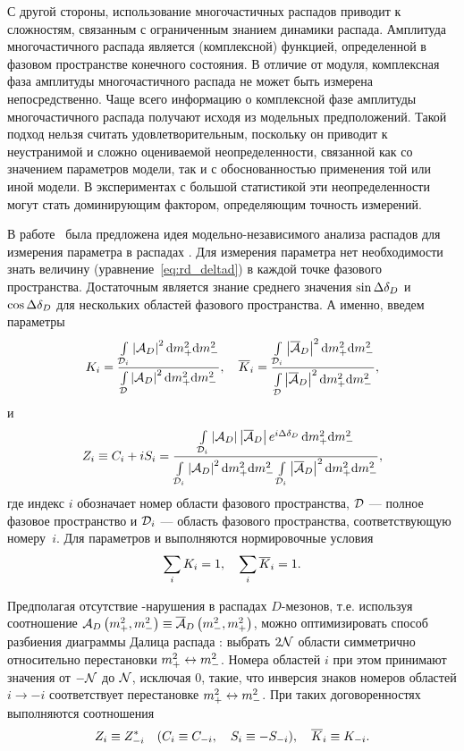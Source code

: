 С другой стороны, использование многочастичных распадов приводит к сложностям, связанным с ограниченным знанием динамики распада.  Амплитуда многочастичного распада является (комплексной) функцией, определенной в фазовом пространстве конечного состояния.  В отличие от модуля, комплексная фаза амплитуды многочастичного распада не может быть измерена непосредственно.  Чаще всего информацию о комплексной фазе амплитуды многочастичного распада получают исходя из модельных предположений.  
Такой подход нельзя считать удовлетворительным, поскольку он приводит к неустранимой и сложно оцениваемой неопределенности, связанной как со значением параметров модели, так и с обоснованностью применения той или иной модели.  В экспериментах с большой статистикой эти неопределенности могут стать доминирующим фактором, определяющим точность измерений.

В работе~\cite{GGSZ} была предложена идея модельно-независимого анализа распадов \dnkpp для измерения параметра \gphi в распадах \bdk.  Для измерения параметра \gphi нет необходимости знать величину \deld (уравнение~\eqref{eq:rd_deltad}) в каждой точке фазового пространства.  Достаточным является знание среднего значения $\sin\Delta\delta_D$ и $\cos\Delta\delta_D$ для нескольких областей фазового пространства.  А именно, введем параметры
\begin{equation}\label{eq:ki}
 K_i = \frac{\int\limits_{\mathcal{D}_i}\left|\mathcal{A}_D\right|^2 \mathrm{d}m_+^2\mathrm{d}m_-^2}
            {\int\limits_{\mathcal{D}}\left|\mathcal{A}_D\right|^2 \mathrm{d}m_+^2\mathrm{d}m_-^2},\quad
 \overline{K}_{i} = \frac{\int\limits_{\mathcal{D}_i}\left|\overline{\mathcal{A}}_D\right|^2 \mathrm{d}m_+^2\mathrm{d}m_-^2}
            {\int\limits_{\mathcal{D}}\left|\overline{\mathcal{A}}_D\right|^2 \mathrm{d}m_+^2\mathrm{d}m_-^2},
\end{equation}
и
\begin{equation}\label{eq:csi}
  Z_i \equiv C_i + iS_i = 
            \frac{\int\limits_{\mathcal{D}_i}
            \left|\mathcal{A}_D\right|\left|\overline{\mathcal{A}}_D\right|
            e^{i\Delta\delta_D}\,\mathrm{d}m_+^2\mathrm{d}m_-^2}
            {\int\limits_{\mathcal{D}_i}\left|\mathcal{A}_D\right|^2 \mathrm{d}m_+^2\mathrm{d}m_-^2 
             \int\limits_{\mathcal{D}_i}\left|\overline{\mathcal{A}}_D\right|^2 \mathrm{d}m_+^2\mathrm{d}m_-^2}
            ,
\end{equation}
где индекс $i$ обозначает номер области фазового пространства, $\mathcal{D}$ --- полное фазовое пространство и $\mathcal{D}_i$ --- область фазового пространства, соответствующую номеру~$i$.  Для параметров \ki и \kbi выполняются нормировочные условия
\begin{equation}
 \sum\limits_i K_i = 1,\quad \sum\limits_i \overline{K}_{i} = 1.
\end{equation}

Предполагая отсутствие \cpconj-нарушения в распадах $D$-мезонов, т.е. используя соотношение $\mathcal{A}_D\left(m_+^2,m_-^2\right)\equiv\overline{\mathcal{A}}_D\left(m_-^2,m_+^2\right)$, можно оптимизировать способ разбиения диаграммы Далица распада \dnkpp: выбрать $2\mathcal{N}$ области симметрично относительно перестановки $m_+^2\leftrightarrow m_-^2$.  Номера областей $i$ при этом принимают значения от $-\mathcal{N}$ до $\mathcal{N}$, исключая $0$, такие, что инверсия знаков номеров областей $i\to -i$ соответствует перестановке $m_+^2\leftrightarrow m_-^2$. При таких договоренностях выполняются соотношения
\begin{equation}\label{eq:cp-conserv-relations}
 Z_i \equiv Z^*_{-i}\quad (C_i\equiv C_{-i},\quad S_i\equiv -S_{-i}),\quad \overline{K}_{i} \equiv K_{-i}.
\end{equation}

